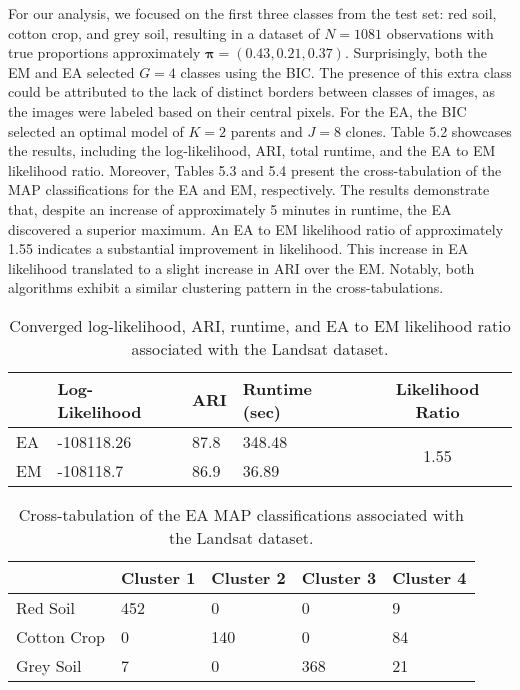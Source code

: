 \documentclass[12pt]{report}
\begin{document}
For our analysis, we focused on the first three classes from the test set: red soil, cotton crop, and grey soil, resulting in a dataset of $N = 1081$ observations with true proportions approximately $\bm{\pi} = (0.43, 0.21, 0.37)$. Surprisingly, both the EM and EA selected $G=4$ classes using the BIC. The presence of this extra class could be attributed to the lack of distinct borders between classes of images, as the images were labeled based on their central pixels. For the EA, the BIC selected an optimal model of $K=2$ parents and $J=8$ clones. Table 5.2 showcases the results, including the log-likelihood, ARI, total runtime, and the EA to EM likelihood ratio. Moreover, Tables 5.3 and 5.4 present the cross-tabulation of the MAP classifications for the EA and EM, respectively. The results demonstrate that, despite an increase of approximately 5 minutes in runtime, the EA discovered a superior maximum. An EA to EM likelihood ratio of approximately 1.55 indicates a substantial improvement in likelihood. This increase in EA likelihood translated to a slight increase in ARI over the EM. Notably, both algorithms exhibit a similar clustering pattern in the cross-tabulations.


\newpage

\begin{table}[!htbp]
  \caption{Converged log-likelihood, ARI, runtime, and EA to EM likelihood ratio associated with the Landsat dataset.}
    \vspace{0.5cm}
  \begin{tabularx}{\textwidth}{l *{3}{X}c}
  \toprule
    &\textbf{Log-Likelihood}& \textbf{ARI} & \textbf{Runtime (sec)} & \textbf{Likelihood Ratio} \\
  \midrule
   EA & -108118.26     & 87.8 &  348.48 & \multirow{2}{*}{1.55}\\
  EM & -108118.7          & 86.9 & 36.89    \\
  \bottomrule
  \end{tabularx}
\end{table}

\begin{table}[!htbp]
  \caption{Cross-tabulation of the EA MAP classifications associated with the Landsat dataset.}
    \vspace{0.5cm}
  \begin{tabularx}{\textwidth}{l *{4}{X}}
  \toprule
   &\textbf{Cluster 1}  & \textbf{Cluster 2}  & \textbf{Cluster 3}  & \textbf{Cluster 4}   \\
  \midrule
  Red Soil & 	452 & 0 & 0 & 9\\
  Cotton Crop &0 & 140 &  0 & 84 \\
   Grey Soil &   7 & 0 &  368  & 21\\
  \bottomrule
  \end{tabularx}
\end{table}
\end{document}
